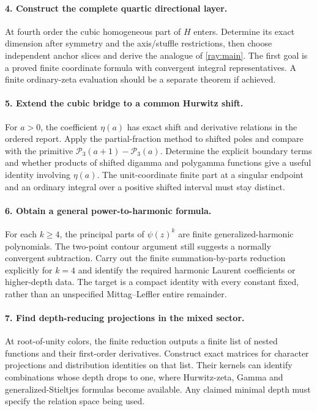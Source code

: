 \documentclass[11pt]{article}
\numberwithin{equation}{section}
\theoremstyle{definition}
\theoremstyle{remark}
\begin{document}
\paragraph{4. Construct the complete quartic directional layer.}
At fourth order the cubic homogeneous part of $H$ enters. Determine
its exact dimension after symmetry and the axis/stuffle restrictions,
then choose independent anchor slices and derive the analogue of
\eqref{ray:main}. The first goal is a proved finite coordinate
formula with convergent integral representatives. A finite
ordinary-zeta evaluation should be a separate theorem if achieved.

\paragraph{5. Extend the cubic bridge to a common Hurwitz shift.}
For $a>0$, the coefficient $\eta(a)$ has exact shift and derivative
relations in the ordered report. Apply the partial-fraction method
to shifted poles and compare with the primitive
$\mathcal P_3(a+1)-\mathcal P_3(a)$. Determine the explicit
boundary terms and whether products of shifted digamma and
polygamma functions give a useful identity involving $\eta(a)$.
The unit-coordinate finite part at a singular endpoint and an
ordinary integral over a positive shifted interval must stay distinct.

\paragraph{6. Obtain a general power-to-harmonic formula.}
For each $k\ge4$, the principal parts of $\psi(z)^k$ are finite
generalized-harmonic polynomials. The two-point contour argument
still suggests a normally convergent subtraction. Carry out the
finite summation-by-parts reduction explicitly for $k=4$ and identify
the required harmonic Laurent coefficients or higher-depth data.
The target is a compact identity with every constant fixed, rather
than an unspecified Mittag--Leffler entire remainder.

\paragraph{7. Find depth-reducing projections in the mixed sector.}
At root-of-unity colors, the finite reduction outputs a finite list
of nested functions and their first-order derivatives. Construct
exact matrices for character projections and distribution identities
on that list. Their kernels can identify combinations whose depth
drops to one, where Hurwitz-zeta, Gamma and generalized-Stieltjes
formulas become available. Any claimed minimal depth must specify
the relation space being used.
\end{document}
